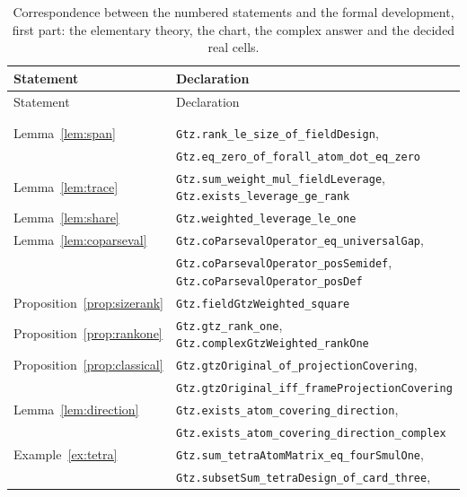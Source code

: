 {\small
\begin{longtable}{@{}ll@{}}
\toprule
Statement & Declaration \\
\midrule
\endfirsthead
\toprule
Statement & Declaration \\
\midrule
\endhead
\endfoot
\bottomrule
\caption{Correspondence between the numbered statements and the formal
development, first part: the elementary theory, the chart, the complex answer
and the decided real cells.}
\label{tab:lean}\\
\endlastfoot
\multicolumn{2}{@{}l}{\emph{\S\ref{sec:first}, elementary cases}}\\
Lemma~\ref{lem:span}           & \texttt{Gtz.rank\_le\_size\_of\_fieldDesign}, \\
                               & \texttt{Gtz.eq\_zero\_of\_forall\_atom\_dot\_eq\_zero} \\
Lemma~\ref{lem:trace}          & \texttt{Gtz.sum\_weight\_mul\_fieldLeverage},
                                 \texttt{Gtz.exists\_leverage\_ge\_rank} \\
Lemma~\ref{lem:share}          & \texttt{Gtz.weighted\_leverage\_le\_one} \\
Lemma~\ref{lem:coparseval}     & \texttt{Gtz.coParsevalOperator\_eq\_universalGap}, \\
                               & \texttt{Gtz.coParsevalOperator\_posSemidef},
                                 \texttt{Gtz.coParsevalOperator\_posDef} \\
Proposition~\ref{prop:sizerank}& \texttt{Gtz.fieldGtzWeighted\_square} \\
Proposition~\ref{prop:rankone} & \texttt{Gtz.gtz\_rank\_one},
                                 \texttt{Gtz.complexGtzWeighted\_rankOne} \\
Proposition~\ref{prop:classical}
                               & \texttt{Gtz.gtzOriginal\_of\_projectionCovering}, \\
                               & \texttt{Gtz.gtzOriginal\_iff\_frameProjectionCovering} \\
Lemma~\ref{lem:direction}      & \texttt{Gtz.exists\_atom\_covering\_direction}, \\
                               & \texttt{Gtz.exists\_atom\_covering\_direction\_complex} \\
Example~\ref{ex:tetra}         & \texttt{Gtz.sum\_tetraAtomMatrix\_eq\_fourSmulOne}, \\
                               & \texttt{Gtz.subsetSum\_tetraDesign\_of\_card\_three}, \\

\end{longtable}}

